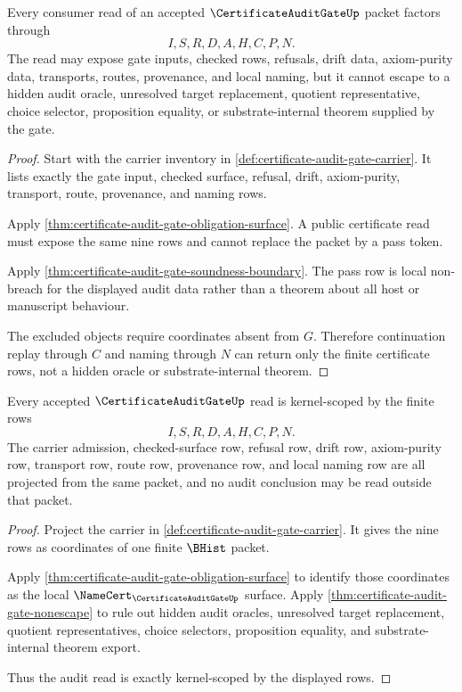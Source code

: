 \begin{theorem}
\label{thm:certificate-audit-gate-nonescape}
Every consumer read of an accepted $\CertificateAuditGateUp$ packet factors through
$$
I,S,R,D,A,H,C,P,N.
$$
The read may expose gate inputs, checked rows, refusals, drift data, axiom-purity data, transports, routes, provenance, and local naming, but it cannot escape to a hidden audit oracle, unresolved target replacement, quotient representative, choice selector, proposition equality, or substrate-internal theorem supplied by the gate.
\end{theorem}
\begin{proof}
Start with the carrier inventory in \autoref{def:certificate-audit-gate-carrier}. It lists exactly the gate input, checked surface, refusal, drift, axiom-purity, transport, route, provenance, and naming rows.

Apply \autoref{thm:certificate-audit-gate-obligation-surface}. A public certificate read must expose the same nine rows and cannot replace the packet by a pass token.

Apply \autoref{thm:certificate-audit-gate-soundness-boundary}. The pass row is local non-breach for the displayed audit data rather than a theorem about all host or manuscript behaviour.

The excluded objects require coordinates absent from $G$. Therefore continuation replay through $C$ and naming through $N$ can return only the finite certificate rows, not a hidden oracle or substrate-internal theorem.
\end{proof}

\begin{theorem}
\label{thm:certificate-audit-gate-kernel-scope}
Every accepted $\CertificateAuditGateUp$ read is kernel-scoped by the finite rows
$$
I,S,R,D,A,H,C,P,N.
$$
The carrier admission, checked-surface row, refusal row, drift row, axiom-purity row, transport row, route row, provenance row, and local naming row are all projected from the same packet, and no audit conclusion may be read outside that packet.
\end{theorem}
\begin{proof}
Project the carrier in \autoref{def:certificate-audit-gate-carrier}. It gives the nine rows as coordinates of one finite $\BHist$ packet.

Apply \autoref{thm:certificate-audit-gate-obligation-surface} to identify those coordinates as the local $\NameCert_{\CertificateAuditGateUp}$ surface. Apply \autoref{thm:certificate-audit-gate-nonescape} to rule out hidden audit oracles, unresolved target replacement, quotient representatives, choice selectors, proposition equality, and substrate-internal theorem export.

Thus the audit read is exactly kernel-scoped by the displayed rows.
\end{proof}

